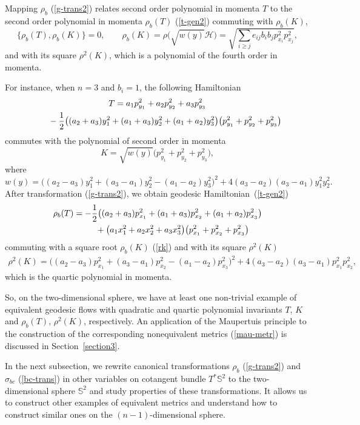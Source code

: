 \documentclass[10pt,a4paper]{amsart}
\numberwithin{equation}{section}
\begin{document}
Mapping $\rho_b$ (\ref{g-trans2}) relates second order polynomial in momenta $T$ to the second order polynomial in momenta $\rho_b(T)$ (\ref{t-gen2}) commuting with $\rho_b(K)$,
\begin{equation}\label{rk}
\{\rho_b(T),\rho_b(K)\}=0 ,\qquad \rho_b(K)=\rho\bigl(\sqrt{ w(y) } \mathcal H\bigr)=\sqrt{ \sum_{i\geq j} e_{ij}b_ib_j p^2_{x_i}p_{x_j}^2 },
\end{equation}
and with its square $\rho^2(K)$, which is a polynomial of the fourth order in momenta.

For instance, when $n=3$ and $b_i=1$, the following Hamiltonian
\begin{gather}
T=a_1p_{y_1}^2 + a_2p_{y_2}^2 + a_3p_{y_3}^2\nonumber\\
\hphantom{T=}{}-\frac{1}{2}\big((a_2+a_3)y_1^2+(a_1+a_3)y_2^2+(a_1+a_2)y_3^2 \big)\big(p_{y_1}^2+p_{y_2}^2+p_{y_3}^2\big)\label{t-trans}
\end{gather}
commutes with the polynomial of second order in momenta
\[
K=\sqrt{ w(y) } \big(p_{y_1}^2+p_{y_2}^2+p_{y_3}^2\big) ,
\]
where
\[
w(y)=\bigl((a_2 - a_3)y_1^2 + (a_3 - a_1)y_2^2-(a_1 - a_2)y_3^2\bigr)^2+4(a_3 - a_2)(a_3 - a_1)y_1^2y_2^2 .
\]
After transformation (\ref{g-trans2}), we obtain geodesic Hamiltonian~(\ref{t-gen2})
\begin{gather*}
\rho_b(T)= -\frac{1}{2}\bigl((a_2+a_3)p_{x_1}^2 + (a_1+a_3)p_{x_2}^2 + (a_1+a_2)p_{x_3}^2\bigr)\\
\hphantom{\rho_b(T)=}{}
 +\big(a_1x_1^2+a_2x_2^2+a_3x_3^2 \big)\big(p_{x_1}^2+p_{x_2}^2+p_{x_3}^2\big)
\end{gather*}
commuting with a square root $\rho_b(K)$ (\ref{rk}) and with its square $\rho^2(K)$
\begin{gather*}
 \rho^2(K)=\bigl((a_2 - a_3)p_{x_1}^2 + (a_3 - a_1)p_{x_2}^2-(a_1 - a_2)p_{x_3}^2\bigr)^2+4(a_3 - a_2)(a_3 - a_1)p_{x_1}^2p_{x_2}^2 ,
\end{gather*}
 which is the quartic polynomial in momenta.

 So, on the two-dimensional sphere, we have at least one non-trivial example of equivalent geodesic flows with quadratic and quartic polynomial invariants $T$, $K$ and $\rho_b(T)$, $\rho^2(K)$, respectively. An application of the Maupertuis principle to the construction of the corresponding nonequivalent metrics (\ref{mau-metr}) is discussed in Section~\ref{section3}.

In the next subsection, we rewrite canonical transformations $\rho_b$ (\ref{g-trans2}) and $\sigma_{bc}$ (\ref{bc-trans}) in other variables on cotangent bundle $T^*\mathbb S^2$ to the two-dimensional sphere $\mathbb S^2$ and study properties of these transformations. It allows us to construct other examples of equivalent metrics and understand how to construct similar ones on the $(n-1)$-dimensional sphere.
\end{document}
